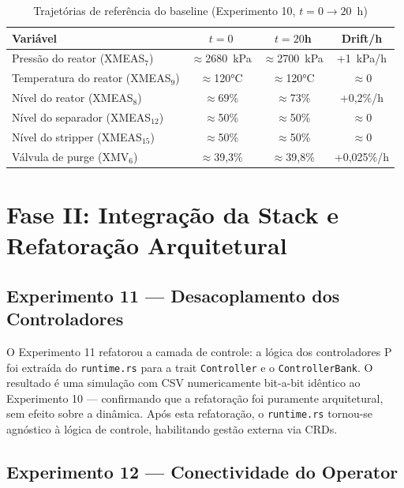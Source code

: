 \begin{table}[ht!]
\centering
\caption{Trajetórias de referência do baseline (Experimento 10, $t = 0 \to 20$~h)}
\label{tab:baseline}
\begin{tabular}{|l|c|c|c|}
\hline
\textbf{Variável}               & \textbf{$t=0$}    & \textbf{$t=20$h}  & \textbf{Drift/h} \\
\hline
Pressão do reator (XMEAS$_7$)  & $\approx$2680~kPa & $\approx$2700~kPa & +1~kPa/h         \\
Temperatura do reator (XMEAS$_9$) & $\approx$120°C & $\approx$120°C   & $\approx$0        \\
Nível do reator (XMEAS$_8$)    & $\approx$69\%     & $\approx$73\%     & +0,2\%/h         \\
Nível do separador (XMEAS$_{12}$) & $\approx$50\%   & $\approx$50\%     & $\approx$0        \\
Nível do stripper (XMEAS$_{15}$)  & $\approx$50\%   & $\approx$50\%     & $\approx$0        \\
Válvula de purge (XMV$_6$)     & $\approx$39,3\%   & $\approx$39,8\%   & +0,025\%/h       \\
\hline
\end{tabular}
\end{table}

\section{Fase II: Integração da Stack e Refatoração Arquitetural}
\label{sec:fase2}

\subsection{Experimento 11 — Desacoplamento dos Controladores}

O Experimento 11 refatorou a camada de controle: a lógica dos controladores P foi extraída do \texttt{runtime.rs} para a trait \texttt{Controller} e o \texttt{ControllerBank}. O resultado é uma simulação com CSV numericamente bit-a-bit idêntico ao Experimento 10 — confirmando que a refatoração foi puramente arquitetural, sem efeito sobre a dinâmica. Após esta refatoração, o \texttt{runtime.rs} tornou-se agnóstico à lógica de controle, habilitando gestão externa via CRDs.

\subsection{Experimento 12 — Conectividade do Operator}

